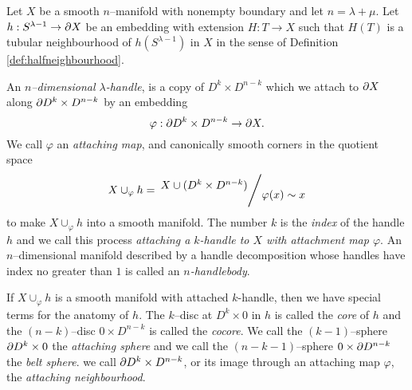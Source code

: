 \begin{defn}[Handle]
	\label{def:handle}	
	Let $X$ be a smooth $n$--manifold with nonempty boundary and let $n=\lambda+\mu$.
	Let $h:S^{\lambda-1}\to \partial X$ be an embedding with extension $H:T\to X$ such that $H(T)$ is a tubular neighbourhood of $h(S^{\lambda-1})$ in $X$ in the sense of Definition \ref{def:halfneighbourhood}.
	
	An \emph{$n$--dimensional $\lambda$-handle}, is a copy of $D^k\times D^{n-k}$ which we attach to $\partial X$ along $\partial D^k\times D^{n-k}$ by an embedding
	\[
	\varphi : \partial D^k \times D^{n-k} \to \partial X.
	\]
	We call $\varphi$ an \emph{attaching map}, and canonically smooth corners \cite{GompStip} in the quotient space
	\[
	X\cup_\varphi h = \quotient{X \cup ( D^k\times D^{n-k} ) }{ \varphi(x) \sim x }
	\]
	to make $X\cup_\varphi h$ into a smooth manifold.
	The number $k$ is the \emph{index} of the handle $h$ and we call this process \emph{attaching a $k$-handle to $X$ with attachment map $\varphi$}.
	An $n$--dimensional manifold described by a handle decomposition whose handles have index no greater than $1$ is called an \emph{$n$-handlebody}.
\end{defn}




If $X\cup_\varphi h$ is a smooth manifold with attached $k$-handle, then we have special terms for the anatomy of $h$.
The $k$--disc at $D^k\times 0$ in $h$ is called the \emph{core} of $h$ and the $(n-k)$--disc $0 \times D^{n-k}$ is called the \emph{cocore}.
We call the $(k-1)$--sphere $\partial D^k \times 0$ the \emph{attaching sphere} and we call the $(n-k-1)$--sphere $ 0 \times \partial D^{n-k}$ the \emph{belt sphere}.
we call $\partial D^k\times D^{n-k}$, or its image through an attaching map $\varphi$, the \emph{attaching neighbourhood}.

